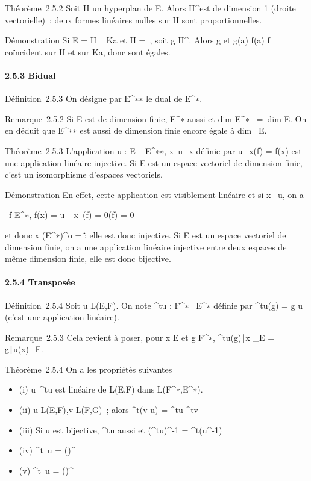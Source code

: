 \documentclass[]{article}
\begin{document}
Théorème~2.5.2 Soit H un hyperplan de E. Alors H^\bot est de
dimension 1 (droite vectorielle)~: deux formes linéaires nulles sur H
sont proportionnelles.

Démonstration Si E = H \oplus~ Ka et H =\
\mathrmKerf, soit g \in H^\bot. Alors g et 
g(a) \over f(a) f coïncident sur H et sur Ka, donc sont
égales.

\paragraph{2.5.3 Bidual}

Définition~2.5.3 On désigne par E^∗∗ le dual de
E^∗.

Remarque~2.5.2 Si E est de dimension finie, E^∗ aussi et
dim E^∗~ =\
dim E. On en déduit que E^∗∗ est aussi de dimension finie
encore égale à dim~ E.

Théorème~2.5.3 L'application u : E \rightarrow~ E^∗∗,
x\mapsto~u_x définie par u_x(f) =
f(x) est une application linéaire injective. Si E est un espace
vectoriel de dimension finie, c'est un isomorphisme d'espaces
vectoriels.

Démonstration En effet, cette application est visiblement linéaire et si
x \in\mathrmKer~u, on a

\forall~f \in E^∗, f(x) = u_ x~(f) =
0(f) = 0

et donc x \in (E^∗)^o =
\0\~; elle est donc injective. Si E
est un espace vectoriel de dimension finie, on a une application
linéaire injective entre deux espaces de même dimension finie, elle est
donc bijective.

\paragraph{2.5.4 Transposée}

Définition~2.5.4 Soit u \in L(E,F). On note ^tu :
F^∗\rightarrow~ E^∗ définie par ^tu(g) = g \cdot u
(c'est une application linéaire).

Remarque~2.5.3 Cela revient à poser, pour x \in E et g \in F^∗,
\langle
^tu(g)∣x\rangle
_E =\langle
g∣u(x)\rangle _F.

Théorème~2.5.4 On a les propriétés suivantes

\begin{itemize}
\itemsep1pt\parskip0pt
\item
  (i) u\mapsto~^tu est linéaire de L(E,F)
  dans L(F^∗,E^∗).
\item
  (ii) u \in L(E,F),v \in L(F,G)~; alors ^t(v \cdot u) =
  ^tu \cdot^tv
\item
  (iii) Si u est bijective, ^tu aussi et
  (^tu)^-1 = ^t(u^-1)
\item
  (iv)
  \mathrmKer^t~u
  =
  (\mathrmImu)^\bot~
\item
  (v)
  \mathrmIm^t~u =
  (\mathrmKeru)^\bot~
\end{itemize}
\end{document}
